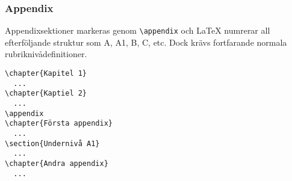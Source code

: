 \subsubsection{Appendix}
Appendixsektioner markeras genom \verb?\appendix? och \LaTeX{} numrerar all efterföljande struktur som A, A1, B, C, etc. Dock krävs fortfarande normala rubriknivådefinitioner.

\begin{verbatim}
\chapter{Kapitel 1}
  ...
\chapter{Kaptiel 2}
  ...
\appendix
\chapter{Första appendix}
  ...
\section{Undernivå A1}
  ...
\chapter{Andra appendix}
  ...
\end{verbatim}


